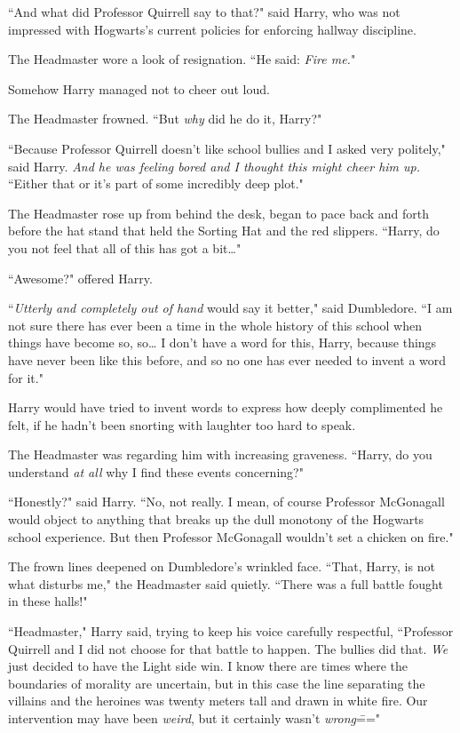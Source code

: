 ``And what did Professor Quirrell say to that?" said Harry, who was not impressed with Hogwarts's current policies for enforcing hallway discipline.

The Headmaster wore a look of resignation. ``He said: \emph{Fire me.}"

Somehow Harry managed not to cheer out loud.

The Headmaster frowned. ``But \emph{why} did he do it, Harry?"

``Because Professor Quirrell doesn't like school bullies and I asked very politely," said Harry. \emph{And he was feeling bored and I thought this might cheer him up.} ``Either that or it's part of some incredibly deep plot."

The Headmaster rose up from behind the desk, began to pace back and forth before the hat stand that held the Sorting Hat and the red slippers. ``Harry, do you not feel that all of this has got a bit{\ldots}"

``Awesome?" offered Harry.

``\emph{Utterly and completely out of hand} would say it better," said Dumbledore. ``I am not sure there has ever been a time in the whole history of this school when things have become so, so{\ldots} I don't have a word for this, Harry, because things have never been like this before, and so no one has ever needed to invent a word for it."

Harry would have tried to invent words to express how deeply complimented he felt, if he hadn't been snorting with laughter too hard to speak.

The Headmaster was regarding him with increasing graveness. ``Harry, do you understand \emph{at all} why I find these events concerning?"

``Honestly?" said Harry. ``No, not really. I mean, of course Professor McGonagall would object to anything that breaks up the dull monotony of the Hogwarts school experience. But then Professor McGonagall wouldn't set a chicken on fire."

The frown lines deepened on Dumbledore's wrinkled face. ``That, Harry, is not what disturbs me," the Headmaster said quietly. ``There was a full battle fought in these halls!"

``Headmaster," Harry said, trying to keep his voice carefully respectful, ``Professor Quirrell and I did not choose for that battle to happen. The bullies did that. \emph{We} just decided to have the Light side win. I know there are times where the boundaries of morality are uncertain, but in this case the line separating the villains and the heroines was twenty meters tall and drawn in white fire. Our intervention may have been \emph{weird}, but it certainly wasn't \emph{wrong}\==="

